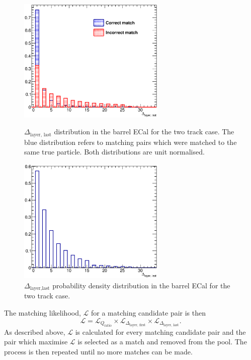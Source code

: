 \begin{figure}
  \centering
  \parbox{7cm}{
    \includegraphics[width=7cm]{images/hough_3d_matching/3DMatching_Barrel_2Track_DLL_Separation.eps}
    \caption{$\Delta_{\textrm{layer, last}}$ distribution in the barrel ECal for the two track case.  The blue distribution refers to matching pairs which were matched to the same true particle.  Both distributions are unit normalised.}
    \label{fig:3DMatchingBarrel2TrackDLLSeparation}}
    \qquad
    \begin{minipage}{7cm}
      \includegraphics[width=7cm]{images/hough_3d_matching/3DMatching_Barrel_2Track_DLL_PDF.eps}
      \caption{$\Delta_{\textrm{layer,last}}$ probability density distribution in the barrel ECal for the two track case.}
      \label{fig:3DMatchingBarrel2TrackDLLPDF}
    \end{minipage}
\end{figure}
\newline
The matching likelihood, $\mathcal{L}$ for a matching candidate pair is then
\begin{equation}
  \mathcal{L} = \mathcal{L}_{Q_{\textrm{ratio}}} \times \mathcal{L}_{\Delta_{\textrm{layer, first}}} \times \mathcal{L}_{\Delta_{\textrm{layer, last}}}.
\end{equation}
As described above, $\mathcal{L}$ is calculated for every matching candidate pair and the pair which maximise $\mathcal{L}$ is selected as a match and removed from the pool.  The process is then repeated until no more matches can be made.
